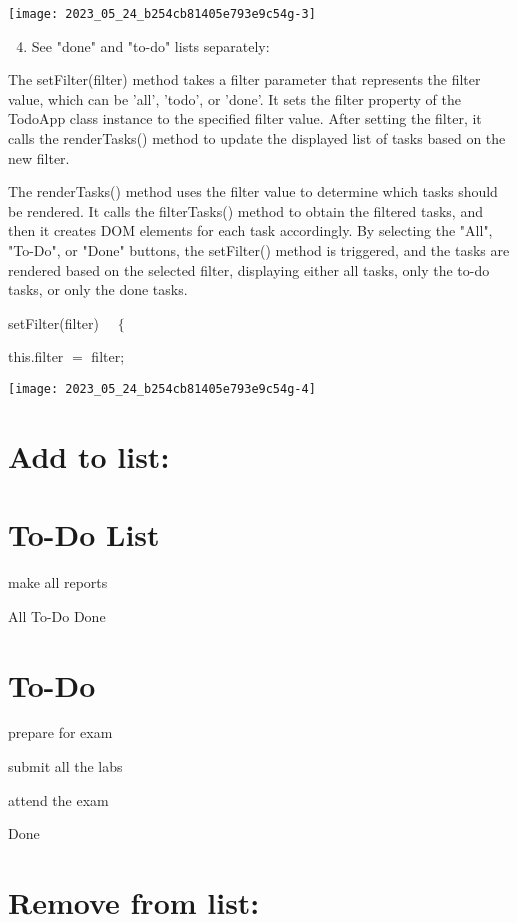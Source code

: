 \documentclass[10pt]{article}
\begin{document}
\begin{center}
\texttt{[image: 2023\_05\_24\_b254cb81405e793e9c54g-3]}
\end{center}

\begin{enumerate}
  \setcounter{enumi}{3}
  \item See "done" and "to-do" lists separately:
\end{enumerate}

The setFilter(filter) method takes a filter parameter that represents the filter value, which can be 'all', 'todo', or 'done'. It sets the filter property of the TodoApp class instance to the specified filter value. After setting the filter, it calls the renderTasks() method to update the displayed list of tasks based on the new filter.

The renderTasks() method uses the filter value to determine which tasks should be rendered. It calls the filterTasks() method to obtain the filtered tasks, and then it creates DOM elements for each task accordingly. By selecting the "All", "To-Do", or "Done" buttons, the setFilter() method is triggered, and the tasks are rendered based on the selected filter, displaying either all tasks, only the to-do tasks, or only the done tasks.

setFilter(filter) $\quad\{$

this.filter $=$ filter;

\begin{center}
\texttt{[image: 2023\_05\_24\_b254cb81405e793e9c54g-4]}
\end{center}

\section{Add to list:}
\section{To-Do List}
make all reports

All To-Do Done

\section{To-Do}
prepare for exam

submit all the labs

attend the exam

Done

\section{Remove from list:}
\end{document}
